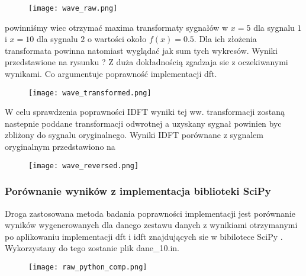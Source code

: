 \documentclass{artikel3}
\begin{document}
\begin{figure}[H]
    \centering
    \texttt{[image: wave\_raw.png]}
\end{figure}

powinniśmy wiec otrzymać maxima transformaty sygnałów w $x=5$ dla sygnalu $1$ i $x=10$ dla sygnalu $2$ o wartości około $f(x)=0.5$. Dla ich złożenia transformata powinna natomiast wyglądać jak sum tych wykresów. Wyniki przedstawione na rysunku ? 
Z duża dokładnością zgadzaja sie z oczekiwanymi wynikami. Co argumentuje poprawność implementacji dft.

\begin{figure}[H]
    \centering
    \texttt{[image: wave\_transformed.png]}
\end{figure}



W celu sprawdzenia poprawności IDFT wyniki tej ww. transformacji zostaną nastepnie poddane transformacji odwrotnej a uzyskany sygnał powinien byc zbliżony do sygnalu oryginalnego. Wyniki IDFT porównane z sygnalem oryginalnym przedstawiono na 

\begin{figure}[H]
    \centering
    \texttt{[image: wave\_reversed.png]}
\end{figure}



\subsubsection{Porównanie wyników z implementacja biblioteki SciPy}

Droga zastosowana metoda badania poprawności implementacji jest porównanie wyników wygenerowanych dla danego zestawu danych z wynikiami otrzymanymi po aplikowaniu implementacji dft i idft znajdujących sie w bibilotece SciPy \cite{scipy_fft}. 
Wykorzystany do tego zostanie plik dane\_10.in.

\begin{figure}[H]
\centering
\texttt{[image: raw\_python\_comp.png]}
\end{figure}


\end{document}
